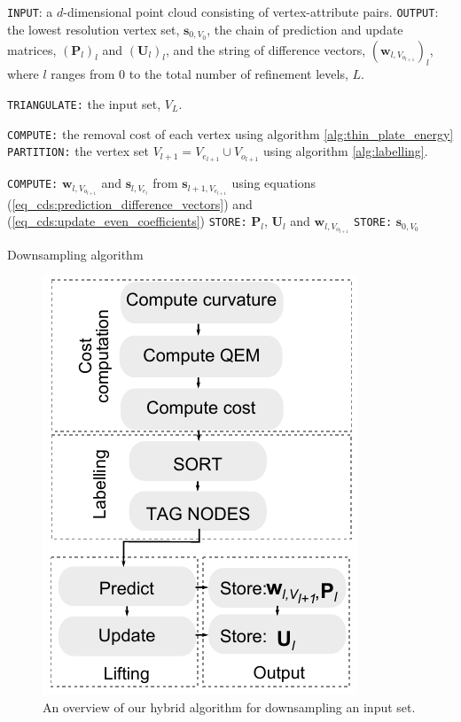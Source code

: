 \documentclass[graybox]{svmult}
\begin{document}
\begin{algorithm}
	\begin{algorithmic}
		\STATE \texttt{INPUT}: a $d$-dimensional point cloud consisting of vertex-attribute pairs.
		\STATE \texttt{OUTPUT}: the lowest resolution vertex set, $\mathbf{s}_{0, V_0}$, the chain of prediction and update matrices, $(\mathbf{P}_l)_l$ and $(\mathbf{U}_l)_l$, and
		the string of difference vectors, $(\mathbf{w}_{l,V_{o_{l+1}}})_l$, where $l$ ranges from $0$ to the total number of refinement levels, $L$.
		
		\STATE \texttt{TRIANGULATE:} the input set, $V_L$.
		
		
		\STATE \texttt{COMPUTE:} the removal cost of each vertex using algorithm \ref{alg:thin_plate_energy}
		\STATE \texttt{PARTITION:} the vertex set $V_{l+1} = V_{e_{l+1}} \cup V_{o_{l+1}}$ using algorithm \ref{alg:labelling}.
		
		\STATE \texttt{COMPUTE:} $\mathbf{w}_{l,V_{o_{l+1}}}$ and $\mathbf{s}_{l,V_{e_{l}}}$ from $\mathbf{s}_{l+1,V_{e_{l+1}}}$ using equations (\ref{eq_cds:prediction_difference_vectors}) 
		and (\ref{eq_cds:update_even_coefficients})
		\STATE \texttt{STORE:} $\mathbf{P}_l$, $\mathbf{U}_l$ and $\mathbf{w}_{l,V_{o_{l+1}}}$
		\ENDFOR
		\STATE \texttt{STORE:}  $\mathbf{s}_{0,V_0}$
	\end{algorithmic}
	\caption{Downsampling algorithm}
	\label{alg:downsampling}
\end{algorithm}

\begin{figure}[htb]
	\centering
	\includegraphics[width=.7\linewidth]{overview_downsampling.pdf}
	\caption{\label{fig_cds:overview_downsampling}
		An overview of our hybrid algorithm for downsampling an input set.}
\end{figure}
\end{document}
